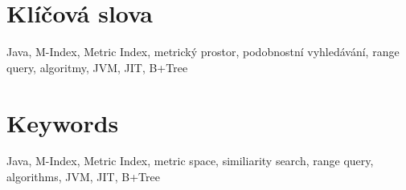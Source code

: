 \section*{Klíčová slova}
Java, M-Index, Metric Index, metrický prostor, podobnostní vyhledávání, range query, algoritmy, JVM, JIT, B+Tree
\section*{Keywords}
Java, M-Index, Metric Index, metric space, similiarity search, range query, algorithms, JVM, JIT, B+Tree
\newpage